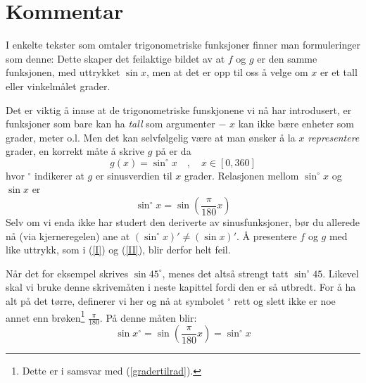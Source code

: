 


\section*{Kommentar}
I enkelte tekster som omtaler trigonometriske funksjoner finner man formuleringer som denne:
Dette skaper det feilaktige bildet av at $ f $ og $ g $ er den samme funksjonen, med uttrykket $ \sin x $, men at det er opp til oss å velge om $ x $ er et tall eller vinkelmålet grader.\vsk

Det er viktig å innse at de trigonometriske funskjonene vi nå har introdusert, er funksjoner som bare kan ha \textit{tall} som argumenter $ - $ $ x $ kan ikke bære enheter som grader, meter o.l. Men det kan selvfølgelig være at man ønsker å la $ x $ \textsl{representere} grader, en korrekt måte å skrive $ g $ på er da
\[ g(x)=\sin^\circ x\quad,\quad x\in[0, 360]\]
hvor $ ^\circ $ indikerer at $ g $ er sinusverdien til $ x $ grader. Relasjonen mellom $ \sin^\circ x $ og $ \sin x $ er
\[ \sin^\circ x =\sin\left(\frac{\pi}{180}x\right) \]
Selv om vi enda ikke har studert den deriverte av sinusfunksjoner, bør du allerede nå (via kjerneregelen) ane at $ (\sin^\circ x )'\neq(\sin x)'$. Å presentere $ f $ og $ g $ med like uttrykk, som i (\ref{I})  og (\ref{II}), blir derfor helt feil.\vsk

Når det for eksempel skrives $ \sin 45^\circ $, menes det altså strengt tatt $ \sin^\circ 45 $. Likevel skal vi bruke denne skrivemåten i neste kapittel fordi den er så utbredt. For å ha alt på det tørre, definerer vi her og nå at symbolet $ ^\circ $ rett og slett ikke er noe annet enn brøken\footnote{Dette er i samsvar med (\ref{gradertilrad}).} $ \frac{\pi}{180} $. På denne måten blir:
\[ \sin x^\circ= \sin\left(\frac{\pi}{180}x\right)=\sin^\circ x \]
\small
\begin{comment}
	Før vi forlater pedanteriet må det også være nevnt at den utbredte introduksjonen av trigonometriske funksjoner via vinkelmål ikke må forlede en til å tro at funksjonene alltid har noe med konkrete vinkler å gjøre. For eksempel har trigonometriske funksjoner en enestående rolle i beskrivelsen av bølgefenomener og svingninger\footnote{Svingninger skal vi se på i kapittelref??}. Spenner du man genstand fast i en fjør og trekker i den slik at den svinger loddrett opp og ned, kan man modellere bevegelsen som en sinusfunksjon varierende med tiden. Det vil da ikke være noen slags vinkel med i denne beskrivelsen.
\end{comment}



